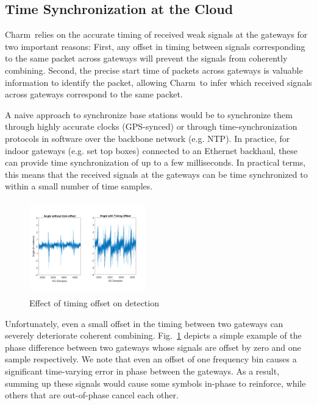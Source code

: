 \subsection{Time Synchronization at the Cloud}
Charm\ relies on the accurate timing of received weak signals at the gateways for two important reasons: First, any offset in timing between signals corresponding to the same packet across  gateways will prevent the signals from coherently combining. Second, the precise start time of packets across gateways is valuable information to identify the packet, allowing Charm\ to infer which received signals across gateways correspond to the same packet.

A naive approach to synchronize base stations would be to synchronize them through highly accurate clocks (GPS-synced) or through time-synchronization protocols in software over the backbone network (e.g. NTP). In practice, for indoor gateways (e.g. set top boxes) connected to an Ethernet backhaul, these can provide time synchronization of up to a few milliseconds. In practical terms, this means that the received signals at the gateways can be time synchronized to within a small number of time samples. 

\begin{figure}
    \centering
    \includegraphics[width=0.45\textwidth, height=1.6in]{figures/TimeOffset.pdf}
    \vspace*{-0.1in}
    \caption{Effect of timing offset on detection}
        \vspace*{-0.0in}

    \label{fig:toffset}
    \compactimg
\end{figure}

Unfortunately, even a small offset in the timing between two gateways can severely deteriorate coherent combining. Fig.~\ref{fig:toffset} depicts a simple example of the phase difference between two gateways whose signals are offset by zero and one sample respectively. We note that even an offset of one frequency bin causes a significant time-varying error in phase between the gateways. As a result, summing up these signals would cause some symbols in-phase to reinforce, while others that are out-of-phase cancel each other. \vspace*{0.1in}

